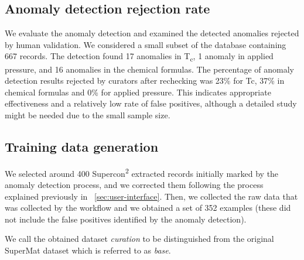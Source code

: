 \documentclass[a4paper]{article}
\begin{document}
\subsection{Anomaly detection rejection rate}
\label{subsec:anomaly-detection-evaluation}

We evaluate the anomaly detection and examined the detected anomalies rejected by human validation. 
We considered a small subset of the database containing 667 records. 
The detection found 17 anomalies in T\textsubscript{c}, 1 anomaly in applied pressure, and 16 anomalies in the chemical formulas. 
The percentage of anomaly detection results rejected by curators after rechecking was 23\% for Tc, 37\% in chemical formulas and 0\% for applied pressure. 
This indicates appropriate effectiveness and a relatively low rate of false positives, although a detailed study might be needed due to the small sample size.

\subsection{Training data generation}
\label{subsec:training-data-generation-evaluation}
We selected around 400 Supercon\textsuperscript{2} extracted records initially marked by the anomaly detection process, and we corrected them following the process explained previously in ~\ref{sec:user-interface}. 
Then, we collected the raw data that was collected by the workflow and we obtained a set of 352 examples (these did not include the false positives identified by the anomaly detection).

We call the obtained dataset \emph{curation} to be distinguished from the original SuperMat dataset which is referred to as \emph{base}.
\end{document}
